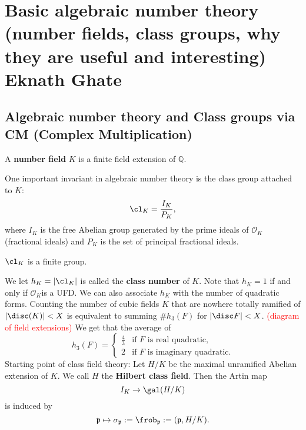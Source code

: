 \chapter{Basic algebraic number theory \\ (number fields, class groups, why they are useful and interesting) \\ Eknath Ghate}\label{ch:3}

\section{Algebraic number theory and Class groups via CM (Complex Multiplication)}\label{sec:3.1}

\begin{definition}
A \textbf{number field} $K$ is a finite field extension of $\mathbb{Q}$.
\end{definition}
One important invariant in algebraic number theory is the class group attached to $K$:
\begin{equation*}
\cl_{K} = \frac{I_{K}}{P_{K}},
\end{equation*}
where $I_{K}$ is the free Abelian group generated by the prime ideals of $\mathscr{O}_{K}$ (fractional ideals) and $P_{K}$ is the set of principal fractional ideals.
\begin{theorem}
$\cl_{K}$ is a finite group.
\end{theorem}
We let $h_{K}=|\cl_{K}|$ is called the \textbf{class number} of $K$.  Note that $h_{K}=1$ if and only if $\mathscr{O}_{K}$is a UFD.  We can also associate $h_{K}$ with the number of quadratic forms.  Counting the number of cubic fields $K$ that are nowhere totally ramified of $|\disc(K)| < X$ is equivalent to summing $\#h_{3}(F)$ for $|\disc F| < X$.  \textcolor{red}{(diagram of field extensions)}  We get that the average of
\begin{equation*}
h_{3}(F) = \begin{cases}
\frac{4}{3} & \text{if } F \text{ is real quadratic}, \\
2 & \text{if } F \text{ is imaginary quadratic}.
\end{cases}
\end{equation*}
Starting point of class field theory:  Let $H/K$ be the maximal unramified Abelian extension of $K$.  We call $H$ the \textbf{Hilbert class field}.  Then the Artin map
\begin{equation*}
I_{K} \to \gal(H/K)
\end{equation*}
is induced by
\begin{equation*}
\mathfrak{p} \mapsto \sigma_{\mathfrak{p}}:=\frob_{\mathfrak{p}}:=(\mathfrak{p},H/K).
\end{equation*}
